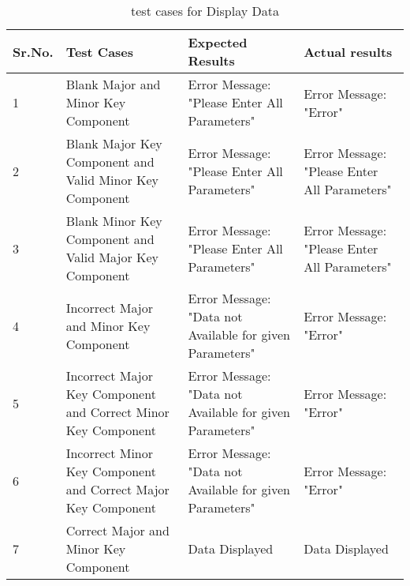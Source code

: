 \begin{table}[h]
\begin{flushleft}
\caption{test cases for Display Data}\label{test cases for Display Data}
\begin{tabular}{|p{1cm}|p{4cm}|p{4cm}|p{5cm}|} \hline
Sr.No. & Test Cases & Expected Results & Actual results \\ \hline
1 & Blank Major and Minor Key Component & Error Message: "Please Enter All Parameters" & Error Message: "Error"\\	 \hline
2 & Blank Major Key Component and Valid Minor Key Component & Error Message: "Please Enter All Parameters" & Error Message: "Please Enter All Parameters"\\	 \hline
3 & Blank Minor Key Component and Valid Major Key Component & Error Message: "Please Enter All Parameters" & Error Message: "Please Enter All Parameters" \\	 \hline
4 & Incorrect Major and Minor Key Component & Error Message: "Data not Available for given Parameters"  &Error Message: "Error" \\	 \hline
5 & Incorrect Major Key Component and Correct Minor Key Component & Error Message: "Data not Available for given Parameters"  & Error Message: "Error"\\	 \hline
6 & Incorrect Minor Key Component and Correct Major Key Component & Error Message: "Data not Available for given Parameters"  & Error Message: "Error"\\	 \hline
7 & Correct Major and Minor Key Component & Data Displayed & Data Displayed\\	 \hline
\end{tabular}
\end{flushleft}
\end{table}

